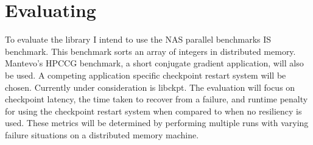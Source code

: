 \documentclass{article}
\begin{document}
\section{Evaluating}
To evaluate the library I intend to use the NAS parallel benchmarks IS
benchmark. This benchmark sorts an array of integers in distributed memory.
Mantevo's HPCCG benchmark, a short conjugate gradient application, will also
be used. A competing application specific checkpoint restart system will be
chosen. Currently under consideration is libckpt.
The evaluation will focus on checkpoint latency, the time taken to
recover from a failure, and runtime penalty for using the checkpoint restart
system when compared to when no resiliency is used. 
These metrics will be determined by performing multiple runs with
varying failure situations on a distributed memory machine.

\nocite{*}



\end{document}
